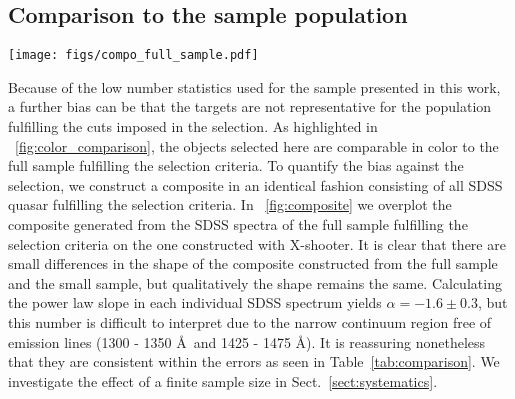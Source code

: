 \documentclass{aa}    %
\newcommand{\figref}[1]{\ref{fig:#1}}
\newcommand{\Fig}[1]{\figurename~\figref{#1}}
\newcommand{\fig}[1]{\Fig{#1}}
\newcommand{\figlabel}[1]{\label{fig:#1}}
\newcommand{\Tab}[1]{Table~\ref{tab:#1}}
\newcommand{\tab}[1]{\Tab{#1}}
\newcommand{\sectionname}{Sect.}
\newcommand{\Sect}[1]{\sectionname~\ref{sect:#1}}
\newcommand{\sect}[1]{\Sect{#1}}
\newcommand{\sectlabel}[1]{\label{sect:#1}}
\begin{document}
\subsection{Comparison to the sample population}  \sectlabel{sample_pop}


\begin{figure*}[t!]
\centering
\texttt{[image: figs/compo\_full\_sample.pdf]}
\caption[]{X-shooter weighted arithmetic quasar composite on a linear wavelength
scale in light brown. The position of several prominent emission lines are
marked. Overplotted in dark green is the corresponding composite generated from
the full sample of SDSS quasars fulfilling the selection criteria and general
agreement is observed, albeit with a brighter Balmer continuum in the
SDSS-constructed composite. In purple is shown the results from fitting both a
pure and a broken power-law to the regions specified in \sect{results} and they
are observed to be indistinguishable.}
\figlabel{composite}
\end{figure*}


Because of the low number statistics used for the sample presented in this work, a
further bias can be that the targets are not representative for the
population fulfilling the cuts imposed in the selection. As
highlighted in \fig{color_comparison}, the objects selected here are comparable in color to the full sample fulfilling the selection criteria. To
quantify the bias against the selection, we construct a composite in
an identical fashion consisting of all SDSS quasar fulfilling the
selection criteria.  In \fig{composite} we overplot the composite
generated from the SDSS spectra of the full sample fulfilling the
selection criteria on the one constructed with X-shooter. It is clear
that there are small differences in the shape of the composite
constructed from the full sample and the small sample, but
qualitatively the shape remains the same. Calculating the power law
slope in each individual SDSS spectrum yields $\alpha = -1.6\pm 0.3$,
but this number is difficult to interpret due to the narrow continuum
region free of emission lines (1300 - 1350 \AA~and 1425 - 1475
\AA). It is reassuring nonetheless that they are consistent within the
errors as seen in \tab{comparison}. We investigate the effect of a
finite sample size in \sect{systematics}.
\end{document}
